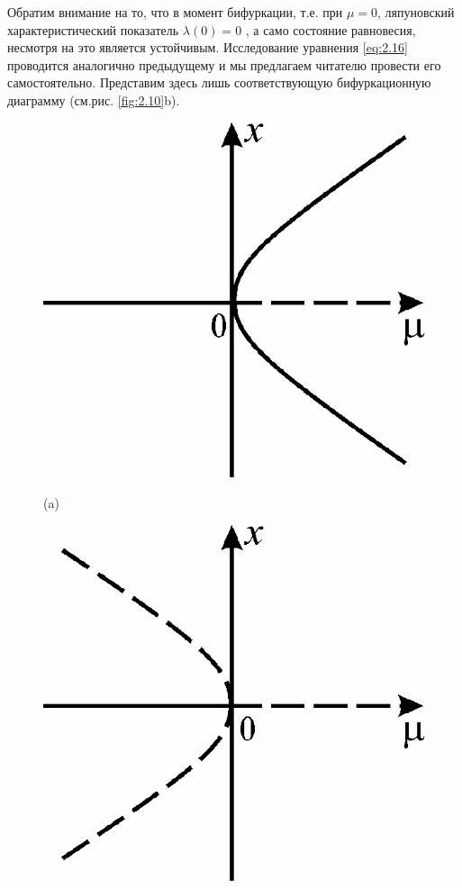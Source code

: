 Обратим внимание на то, что в момент бифуркации, т.е. при $\mu=0$, ляпуновский характеристический показатель $\lambda(0) = 0$ , а само состояние равновесия, несмотря на это является устойчивым. Исследование уравнения \eqref{eq:2.16} проводится аналогично предыдущему и мы предлагаем читателю провести его самостоятельно. Представим здесь лишь соответствующую бифуркационную диаграмму (см.рис. \ref{fig:2.10}b).
\begin{figure}[h!]
    \centering
    \begin{minipage}{0.45\linewidth}
            \centering
            \includegraphics[]{fig/lect2/10a}

            (a)
    \end{minipage}
    \begin{minipage}{0.45\linewidth}
            \centering
            \includegraphics[]{fig/lect2/10b}


\end{minipage}
\end{figure}
